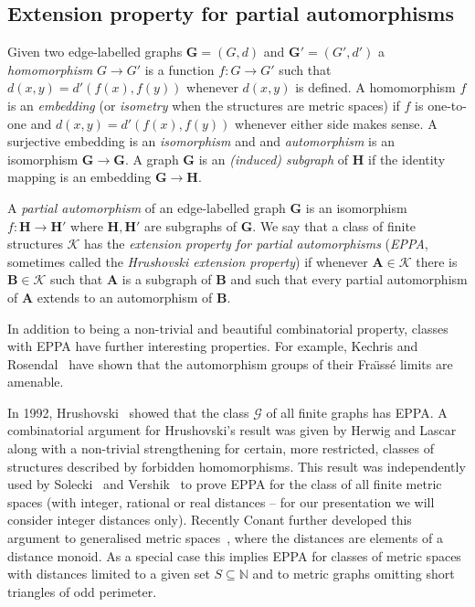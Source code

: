 \documentclass[11pt]{amsart}
\def\str#1{\mathbf {#1}}
\def\K{{\mathcal K}}
\def\Fraisse{Fra\"{\i}ss\' e}
\begin{document}
\subsection{Extension property for partial automorphisms} \label{sec:EPPA}

Given two edge-labelled graphs $\str{G}=(G,d)$ and $\str{G}'=(G',d')$ a {\em homomorphism} $G\to G'$ is a function $f\colon G\to G'$
such that $d(x,y)=d'(f(x),f(y))$ whenever $d(x,y)$ is defined.
A homomorphism $f$ is an {\em embedding} (or {\em isometry} when the structures are metric spaces) if $f$ is one-to-one and $d(x,y)=d'(f(x),f(y))$ whenever either side
makes sense. A surjective embedding is an {\em isomorphism} and and {\em automorphism} is an isomorphism $\str{G}\to \str{G}$. A graph $\str{G}$ is an {\em (induced) subgraph} of $\str{H}$ if the identity mapping is an embedding $\str{G}\to \str{H}$.

A {\em partial automorphism} of an edge-labelled graph  $\str{G}$
is an isomorphism $f \colon \str{H} \to \str{H}'$ where $\str{H}, \str{H}'$ are subgraphs of $\str{G}$.  
We say that a class of finite structures $\K$  has the {\em extension property for
partial automorphisms}  ({\em EPPA}, sometimes called the {\em Hrushovski extension
property}) if whenever $\str{A} \in \K$ there is $\str{B} \in \K$ such that
$\str{A}$ is a subgraph of $\str{B}$ and such that
every partial automorphism of $\str{A}$ extends to an automorphism of $\str{B}$.

In addition to being a non-trivial and beautiful combinatorial property,
classes with EPPA have further interesting properties. For example, Kechris and
Rosendal~\cite{Kechris2007} have shown that the automorphism groups of their
\Fraisse{} limits are amenable.

In 1992, Hrushovski~\cite{hrushovski1992}
 showed that the class $\mathcal G$ of
all finite graphs has EPPA.  A combinatorial argument for Hrushovski's result
was given by Herwig and Lascar~\cite{herwig2000}
 along with a non-trivial
strengthening for certain, more restricted, classes of structures described by
forbidden homomorphisms. This result was independently used by
Solecki~\cite{Solecki2005} and Vershik~\cite{vershik2008} to prove EPPA for the
class of all finite metric spaces (with integer, rational or real distances -- for our presentation we will consider integer distances only).
 Recently Conant further developed this argument to generalised metric spaces~\cite{Conant2015}, where the distances are elements of a distance monoid. As a special case this implies EPPA for classes of metric spaces with distances limited to a given set
$S\subseteq \mathbb N$ and to metric graphs omitting short triangles of odd perimeter.
\end{document}
